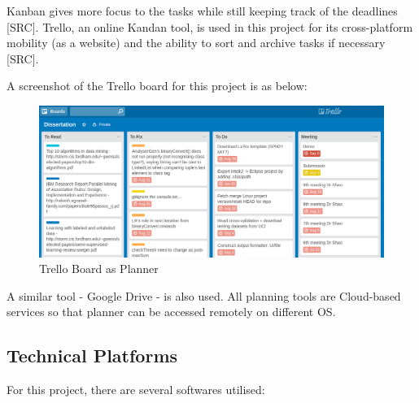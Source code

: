 Kanban gives more focus to the tasks while still keeping track of the deadlines [SRC]. Trello, an online Kandan tool, is used in this project for its cross-platform mobility (as a website) and the ability to sort and archive tasks if necessary [SRC].

A screenshot of the Trello board for this project is as below:

\begin{figure}[h]
    \centering
    \includegraphics[width=5.5in]{figures/trello}
    \caption[Trello Board as Planner]{Trello Board as Planner}
    \label{fig:figure4_7}
\end{figure}

A similar tool - Google Drive - is also used. All planning tools are Cloud-based services so that planner can be accessed remotely on different OS. 

\subsection{Technical Platforms}

For this project, there are several softwares utilised:

